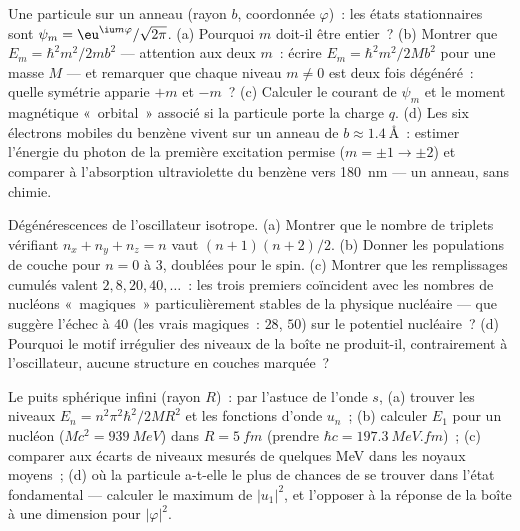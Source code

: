 \begin{exercise}[$\star\star$]\label{exo:b3:schrodinger-three-dimensions:5}
Une particule sur un anneau (rayon $b$, coordonnée $\varphi$)~: les
états stationnaires sont $\psi_m = \eu^{\iu m\varphi}/\sqrt{2\pi}$. (a)
Pourquoi $m$ doit-il être entier~? (b) Montrer que
$E_m = \hbar^2m^2/2mb^2$ --- attention aux deux $m$~: écrire
$E_m = \hbar^2 m^2/2Mb^2$ pour une masse $M$ --- et remarquer que
chaque niveau $m \neq 0$ est deux fois dégénéré~: quelle symétrie
apparie $+m$ et $-m$~? (c) Calculer le courant de $\psi_m$ et le moment
magnétique «~orbital~» associé si la particule porte la charge $q$. (d)
Les six électrons mobiles du benzène vivent sur un anneau de
$b \approx \qty{1.4}{\angstrom}$~: estimer l'énergie du photon de la
première excitation permise ($m = \pm1 \to \pm2$) et comparer à
l'absorption ultraviolette du benzène vers \qty{180}{nm} --- un anneau,
sans chimie.
\end{exercise}

\begin{exercise}[$\star\star$]\label{exo:b3:schrodinger-three-dimensions:6}
Dégénérescences de l'oscillateur isotrope. (a) Montrer que le nombre de
triplets vérifiant $n_x + n_y + n_z = n$ vaut $(n+1)(n+2)/2$. (b)
Donner les populations de couche pour $n = 0$ à $3$, doublées pour le
spin. (c) Montrer que les remplissages cumulés valent $2, 8, 20, 40, \dots$~: les trois premiers
coïncident avec les nombres de nucléons «~magiques~» particulièrement
stables de la physique nucléaire --- que suggère l'échec à $40$ (les
vrais magiques~: $28$, $50$) sur le potentiel nucléaire~? (d) Pourquoi
le motif irrégulier des niveaux de la boîte ne produit-il, contrairement
à l'oscillateur, aucune structure en couches marquée~?
\end{exercise}

\begin{exercise}[$\star\star$]\label{exo:b3:schrodinger-three-dimensions:7}
Le puits sphérique infini (rayon $R$)~: par l'astuce de l'onde $s$,
(a) trouver les niveaux $E_n = n^2\pi^2\hbar^2/2MR^2$ et les fonctions
d'onde $u_n$~; (b) calculer $E_1$ pour un nucléon ($Mc^2 =
\qty{939}{MeV}$) dans $R = \qty{5}{fm}$ (prendre $\hbar c =
\qty{197.3}{MeV.fm}$)~; (c) comparer aux écarts de niveaux mesurés de
quelques MeV dans les noyaux moyens~; (d) où la particule a-t-elle le
plus de chances de se trouver dans l'état fondamental --- calculer le
maximum de $|u_1|^2$, et l'opposer à la réponse de la boîte à une
dimension pour $|\varphi|^2$.
\end{exercise}

